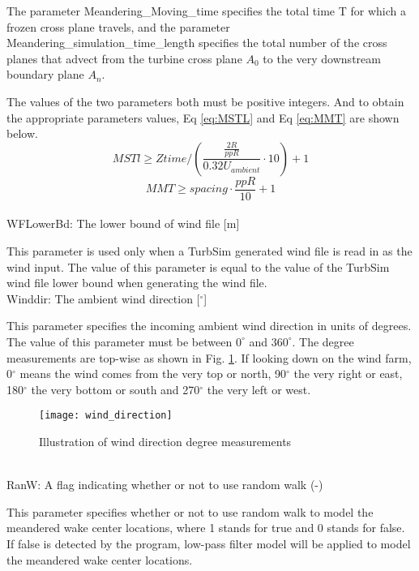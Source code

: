\documentclass{umthesis}
\begin{document}
The parameter Meandering\_Moving\_time specifies the total time T for which a frozen cross plane travels, and the parameter Meandering\_simulation\_time\_length specifies the total number of the cross planes that advect from the turbine cross plane $A_0$ to the very downstream boundary plane $A_n$.

The values of the two parameters both must be positive integers. And to obtain the appropriate parameters values, Eq \ref{eq:MSTL} and Eq \ref{eq:MMT} are shown below.
\begin{equation}\label{eq:MSTL}
  MSTl\geq Ztime/(\frac{\frac{2R}{ppR}}{0.32U_{ambient}}\cdot 10)+1
\end{equation}
\begin{equation}\label{eq:MMT}
  MMT\geq spacing\cdot\frac{ppR}{10}+1
\end{equation}
\\

\noindent WFLowerBd: The lower bound of wind file [m]

This parameter is used only when a TurbSim generated wind file is read in as the wind input. The value of this parameter is equal to the value of the TurbSim wind file lower bound when generating the wind file.\\

\noindent Winddir: The ambient wind direction [$ ^\circ $]

This parameter specifies the incoming ambient wind direction in units of degrees. The value of this parameter must be between $0^\circ$ and $360^\circ$. The degree measurements are top-wise as shown in Fig. \ref{fig:wind_direction}. If looking down on the wind farm, 0$^\circ$ means the wind comes from the very top or north, 90$^\circ$ the very right or east, 180$^\circ$ the very bottom or south and 270$^\circ$ the very left or west.
\begin{figure}
  \centering
  \texttt{[image: wind\_direction]}
  \caption{Illustration of wind direction degree measurements}\label{fig:wind_direction}
\end{figure}
\\

\noindent RanW: A flag indicating whether or not to use random walk (-)

This parameter specifies whether or not to use random walk to model the meandered wake center locations, where 1 stands for true and 0 stands for false. If false is detected by the program, low-pass filter model will be applied to model the meandered wake center locations.\\
\end{document}

